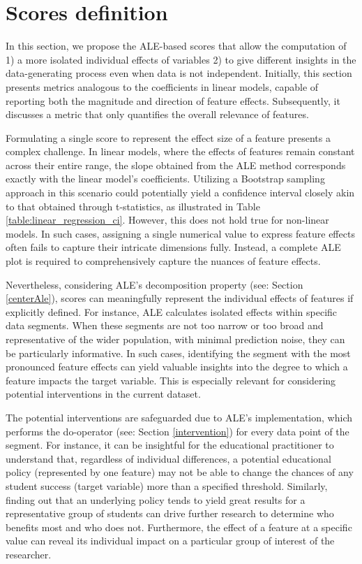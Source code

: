 \section{Scores definition}

In this section, we propose the \gls{ALE}-based scores that allow the computation of 1) a more isolated individual effects of variables 2) to give different insights in the data-generating process even when data is not independent.   Initially, this section presents metrics analogous to the coefficients in linear models, capable of reporting both the magnitude and direction of feature effects. Subsequently, it discusses a metric that only quantifies the overall relevance of features.

Formulating a single score to represent the effect size of a feature presents a complex challenge. In linear models, where the effects of features remain constant across their entire range, the slope obtained from the \gls{ALE} method corresponds exactly with the linear model's coefficients. Utilizing a Bootstrap sampling approach in this scenario could potentially yield a confidence interval closely akin to that obtained through t-statistics, as illustrated in Table \ref{table:linear_regression_ci}. However, this does not hold true for non-linear models. In such cases, assigning a single numerical value to express feature effects often fails to capture their intricate dimensions fully. Instead, a complete \gls{ALE} plot is required to comprehensively capture the nuances of feature effects. 

Nevertheless, considering  \gls{ALE}'s decomposition property (see: Section \ref{centerAle}), scores can meaningfully represent the individual effects of features if explicitly defined. For instance, ALE calculates isolated effects within specific data segments. When these segments are not too narrow or too broad and representative of the wider population, with minimal prediction noise, they can be particularly informative. In such cases, identifying the segment with the most pronounced feature effects can yield valuable insights into the degree to which a feature impacts the target variable. This is especially relevant for considering potential interventions in the current dataset. 

The potential interventions are safeguarded due to \gls{ALE}'s implementation, which performs the do-operator (see: Section \ref{intervention}) for every data point of the segment. For instance, it can be insightful for the educational practitioner to understand that, regardless of individual differences, a potential educational policy (represented by one feature) may not be able to change the chances of any student success (target variable) more than a specified threshold. Similarly, finding out that an underlying policy tends to yield great results for a representative group of students can drive further research to determine who benefits most and who does not. Furthermore, the effect of a feature at a specific value can reveal its individual impact on a particular group of interest of the researcher. 


